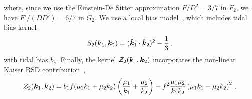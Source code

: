 where, since we use the Einstein-De Sitter approximation $F/D^2 = 3/7$ in $F_2$, we have $F'/(D D') = 6/7$ in $G_2$. We use a local bias model~\citep{Desjacques:2016bnm}, which includes tidal bias kernel
\begin{equation}
    S_2(\bm {k}_1,\bm {k}_2) = (\hat{\bm {k}}_1 \cdot \hat{\bm {k}}_2)^2 - \frac{1}{3}\,, 
\end{equation}
with tidal bias $b_s$. Finally, the kernel $\mathcal{Z}_2(\bm {k}_1,\bm {k}_2)$ incorporates the non-linear Kaiser RSD contribution~\citep{Verde:1998zr,Scoccimarro:1999ed}, 
\begin{equation}
    \mathcal{Z}_2(\bm {k}_1,\bm {k}_2) = b_1 f (\mu_1 k_1 + \mu_2 k_2) \left( \frac{\mu_1}{k_1} + \frac{\mu_2}{k_2} \right) + f^2 \frac{\mu_1 \mu_2}{k_1 k_2} \left( \mu_1 k_1 + \mu_2 k_2 \right)^2\,.
\end{equation}


